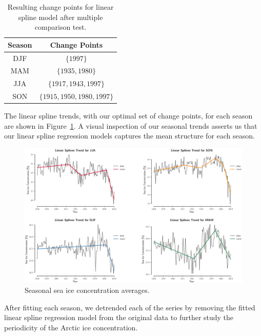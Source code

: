 \documentclass[12pt]{article}
\begin{document}
\begin{table}[!htb]
\centering
\begin{tabular}{|c|c|}
\hline
\textbf{Season}       & \textbf{Change Points} \\ \hline\hline
DJF & $\{1997\}$ \\ \hline
MAM & $\{1935, 1980\}$ \\ \hline
JJA & $\{1917, 1943,1997\}$ \\ \hline
SON & $\{1915, 1950, 1980, 1997\}$ \\ \hline
\end{tabular}
\caption{Resulting change points for linear spline model after multiple comparison test.}\label{my_cps}
\end{table}

The linear spline trends, with our optimal set of change points, for each season are shown in Figure~\ref{trends}. A visual inspection of our seasonal trends asserts us that our linear spline regression models captures the mean structure for each season.

\begin{figure}[H]
  \includegraphics[width=1\textwidth,height=0.5\textheight,center]{figs/trends}
  \caption{Seasonal sea ice concentration averages.}\label{trends}
\end{figure}

After fitting each season, we detrended each of the series by removing the fitted linear spline regression model from the original data to further study the periodicity of the Arctic ice concentration.
\end{document}
